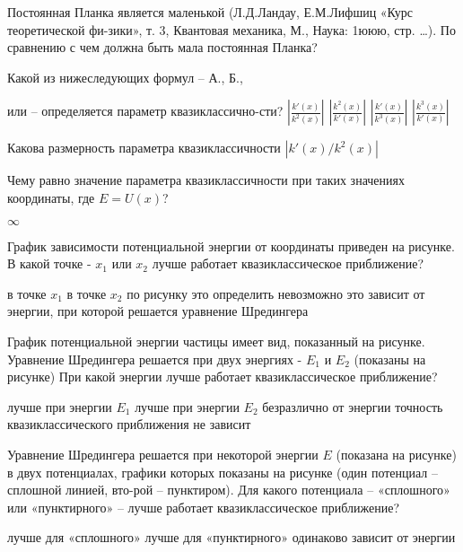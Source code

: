 \documentclass[11pt,a4paper]{exam}
\begin{document}
\begin{questions}
\question Постоянная Планка является маленькой (Л.Д.Ландау, Е.М.Лифшиц «Курс теоретической фи-зики», т. 3, Квантовая механика, М., Наука: 1ююю, стр. …). По сравнению с чем должна быть мала постоянная Планка?
\begin{choices}
\end{choices}

\question Какой из нижеследующих формул – А., Б., 
\begin{choices}
\choice или 
\choice – определяется параметр квазиклассично-сти? 
\choice $\left| {\frac{{k'(x)}}{{{k^2}(x)}}} \right|$      
\choice $\left| {\frac{{{k^2}(x)}}{{k'(x)}}} \right|$      
\choice $\left| {\frac{{k'(x)}}{{{k^3}(x)}}} \right|$      
\choice $\left| {\frac{{{k^3}(x)}}{{k'(x)}}} \right|$
\end{choices}

\question Какова размерность параметра квазиклассичности $|k'(x)/{k^2}(x)|$
\begin{choices}
\choice       
\choice       
\choice       
\choice 
\end{choices}

\question Чему равно значение параметра квазиклассичности при таких значениях координаты, где $E = U(x)$?
\begin{choices}
\choice $\infty $      
\end{choices}

\question График зависимости потенциальной энергии от координаты приведен на рисунке. В какой точке - ${x_1}$ или ${x_2}$ лучше работает квазиклассическое приближение?
\begin{choices}
\choice в точке ${x_1}$
\choice в точке ${x_2}$
\choice по рисунку это определить невозможно
\choice это зависит от энергии, при которой решается уравнение Шредингера
\end{choices}

\question График потенциальной энергии частицы имеет вид, показанный на рисунке. Уравнение Шредингера решается при двух энергиях - ${E_1}$ и ${E_2}$ (показаны на рисунке) При какой энергии лучше работает квазиклассическое приближение?
\begin{choices}
\choice лучше при энергии ${E_1}$
\choice лучше при энергии ${E_2}$
\choice безразлично
\choice от энергии точность квазиклассического приближения не зависит
\end{choices}

\question Уравнение Шредингера решается при некоторой энергии $E$ (показана на рисунке) в двух потенциалах, графики которых показаны на рисунке (один потенциал – сплошной линией, вто-рой – пунктиром). Для какого потенциала – «сплошного» или «пунктирного» – лучше работает квазиклассическое приближение?
\begin{choices}
\choice лучше для «сплошного»      
\choice лучше для «пунктирного»
\choice одинаково            
\choice зависит от энергии
\end{choices}


\end{questions}
\end{document}
